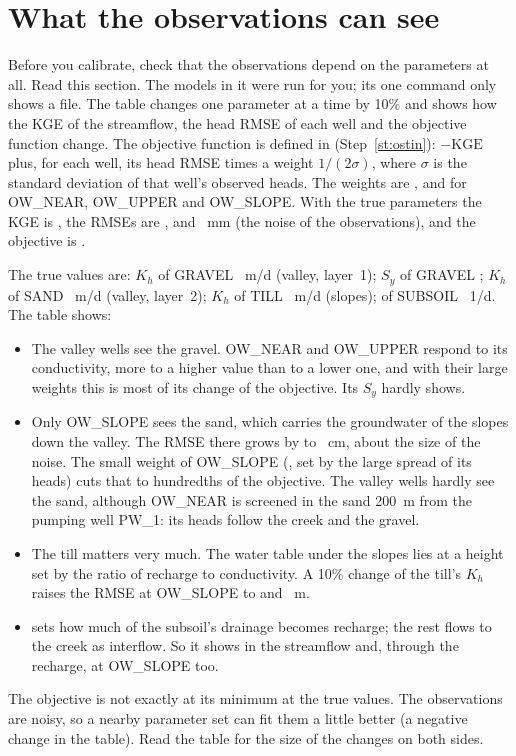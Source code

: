\section{What the observations can see}\label{sec:ident}
Before you calibrate, check that the observations depend on the parameters at all. Read this section. The models in it
were run for you; its one command only shows a file. The table changes one parameter at a time by 10\% and shows how the KGE of the streamflow, the head RMSE of
each well and the objective function change. The objective function is defined in 
(Step~\ref{st:ostin}): $-\mathrm{KGE}$ plus, for each well, its head RMSE times a weight $1/(2\sigma)$, where $\sigma$ is the
standard deviation of that well's observed heads. The weights are ,  and  for OW\_NEAR,
OW\_UPPER and OW\_SLOPE. With the true parameters the KGE is , the RMSEs are ,
 and ~mm (the noise of the observations), and the objective is .
\begin{center}\small

\end{center}
The true values are: $K_h$ of GRAVEL ~m/d (valley, layer~1); $S_y$ of GRAVEL ;
$K_h$ of SAND ~m/d (valley, layer~2); $K_h$ of TILL ~m/d (slopes);  of
SUBSOIL ~1/d. The table shows:
\begin{itemize}
\item The valley wells see the gravel. OW\_NEAR and OW\_UPPER respond to its conductivity, more to a higher value than to
  a lower one, and with their large weights this is most of its change of the objective. Its $S_y$ hardly shows.
\item Only OW\_SLOPE sees the sand, which carries the groundwater of the slopes down the valley. The RMSE there grows by
   to ~cm, about the size of the noise. The small weight of OW\_SLOPE
  (, set by the large spread of its heads) cuts that to hundredths of the objective. The valley wells hardly see
  the sand, although OW\_NEAR is screened in the sand 200~m from the pumping well PW\_1: its heads follow the creek and the
  gravel.
\item The till matters very much. The water table under the slopes lies at a height set by the ratio of recharge to
  conductivity. A 10\% change of the till's $K_h$ raises the RMSE at OW\_SLOPE to  and
  ~m.
\item {} sets how much of the subsoil's drainage becomes recharge; the rest flows to the creek as interflow.
  So it shows in the streamflow and, through the recharge, at OW\_SLOPE too.
\end{itemize}
The objective is not exactly at its minimum at the true values. The observations are noisy, so a nearby parameter set can
fit them a little better (a negative change in the table). Read the table for the size of the changes on both sides.

